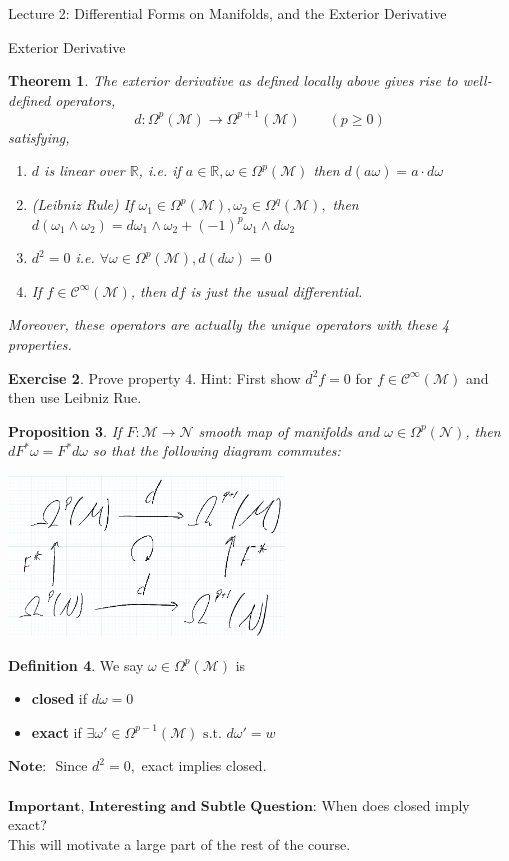 \documentclass[10pt]{article}
\theoremstyle{plain}
\newtheorem{thm}{Theorem}[section] %
\newtheorem{prop}[thm]{Proposition}
\theoremstyle{definition}
\newtheorem{defn}[thm]{Definition} %
\newtheorem{exercise}[thm]{Exercise}
\newcommand{\st}{\text{ s.t. }}
\newcommand{\Note}{\textbf{Note: }}
\newcommand{\Real}{\mathbb{R}}
\newcommand{\man}{\mathcal{M}}
\newcommand{\nan}{\mathcal{N}}
\newcommand{\wedgge}{\omega_1\wedge\omega_2}
\newcommand{\pformman}[1]{\Omega^{#1}(\man)}
\newcommand{\pformnan}[1]{\Omega^{#1}(\nan)}
\newcommand{\deriv}{d}
\newcommand{\df}{df}
\newcommand{\dw}{d\omega}
\newcommand{\cts}[1]{\mathcal{C}^{\infty}(#1)}
\begin{document}
\begin{section}{Lecture 2: Differential Forms on Manifolds, and the Exterior Derivative}
\begin{subsection}{Exterior Derivative}
\begin{thm}
The exterior derivative as defined locally above gives rise to well-defined operators,
$$\deriv : \pformman{p} \to \pformman{p+1} \qquad (p\geq 0)$$
satisfying,
\begin{enumerate}
    \item $\deriv$ is linear over $\Real$, i.e. if $a\in\Real,\omega \in \pformman{p}$ then $\deriv(a\omega) = a \cdot\dw$
    \item (Leibniz Rule) If $\omega_1 \in \pformman{p},\omega_2 \in \pformman{q}, $ then $\deriv(\wedgge) = \dw_1\wedge\omega_2 +(-1)^p\omega_1\wedge \dw_2$
    \item $\deriv ^2 = 0$ i.e. $\forall \omega \in \pformman{p} , \deriv(\dw) = 0$
    \item If $f\in\cts{\man}$, then $\df$ is just the usual differential.
\end{enumerate}
Moreover, these operators are actually the unique operators with these 4 properties.
\end{thm}
\begin{exercise}
Prove property 4. Hint: First show $\deriv^2f = 0$ for $f\in\cts{\man}$ and then use Leibniz Rue.
\end{exercise}
\end{subsection}
\begin{prop}
If $F : \man \to \nan$ smooth map of manifolds and $\omega\in\pformnan{p}$, then $\deriv F^*\omega = F^*\dw$ so that the following diagram commutes:
\begin{center}\includegraphics[width=0.55\textwidth]{PullbackCommutesDifferential.png}\end{center}
\end{prop}
\begin{defn}
We say $\omega\in\pformman{p}$ is 
\begin{itemize}
    \item \textbf{closed} if $\dw = 0$
    \item \textbf{exact} if $\exists \omega' \in \pformman{p-1} \st \dw'=w$
\end{itemize}
\end{defn}
$\Note $ Since $\deriv^2 = 0,$ exact implies closed.
\\\\
$\textbf{Important, Interesting and Subtle Question:}$ When does closed imply exact? \\This will motivate a large part of the rest of the course.
\end{section}
\end{document}
